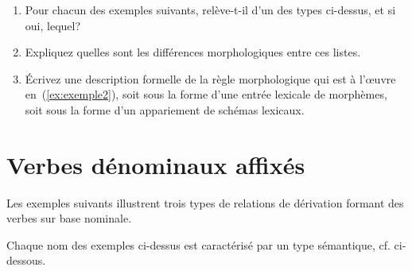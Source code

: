 \begin{exe}
  \ex
  \begin{xlist}
    \ex \absurditeexdeux 
    \ex \label{ex:exemple2} \adaptabiliteexdeux
    \ex \biodiversiteexdeux
    \ex \bonteexdeux
    \ex \pariteexdeux
  \end{xlist}
\end{exe}

\begin{enumerate}
\item Pour chacun des exemples suivants, relève-t-il d'un des types ci-dessus, et si oui, lequel?
  \begin{exe}
    \ex \aclasserexdeux
  \end{exe}
\item Expliquez quelles sont les différences morphologiques entre ces listes.
  
\item Écrivez une description formelle de la règle morphologique qui est à l'œuvre en~(\ref{ex:exemple2}), soit sous la forme d'une entrée lexicale de morphèmes, soit sous la forme d'un appariement de schémas lexicaux.
\end{enumerate}

\section{Verbes dénominaux affixés}

Les exemples suivants illustrent trois types de relations de dérivation formant des verbes sur base nominale. 

\begin{exe}
  \ex \label{ex:exemple31}
  \begin{xlist}
    \ex \panifierextrois  
    \ex  \embrasserextrois
    \ex \vampiriserextrois
  \end{xlist}
\end{exe}

Chaque nom des exemples ci-dessus est caractérisé par un type sémantique, cf. ci-dessous.


\begin{exe}
\ex \label{ex:exemple32} \begin{xlist}
\ex \painextroisbis
\ex \label{ex:exemple3}\brasextroisbis
\ex \vampireextroisbis
\end{xlist}
\end{exe}

